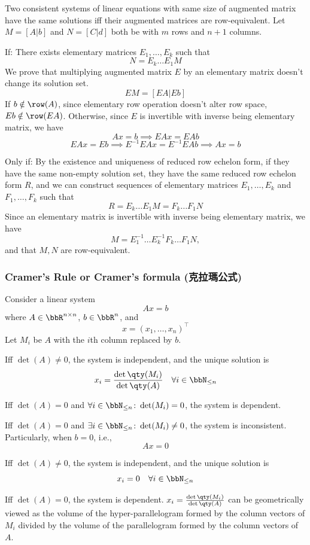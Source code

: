 \documentclass[a4paper,12pt]{report}
\begin{document}
Two consistent systems of linear equations with same size of augmented matrix have the same solutions iff their augmented matrices are row-equivalent.
\bpr
Let $M=[A|b]$ and $N=[C|d]$ both be with $m$ rows and $n+1$ columns.

If: There exists elementary matrices $E_1,\ldots, E_k$ such that
\[N=E_k\ldots E_1M\]
We prove that multiplying augmented matrix $E$ by an elementary matrix doesn't change its solution set.
\[EM=[EA|Eb]\]
If $b\notin\row(A)$, since elementary row operation doesn't alter row space, $Eb\notin\row(EA)$. Otherwise, since $E$ is invertible with inverse being elementary matrix, we have
\[Ax=b\implies EAx=EAb\]
\[EAx=Eb\implies E^{-1}EAx=E^{-1}EAb\implies Ax=b\]

Only if: By the existence and uniqueness of reduced row echelon form, if they have the same non-empty solution set, they have the same reduced row echelon form $R$, and we can construct sequences of elementary matrices $E_1,\ldots,E_k$ and $F_1,\ldots,F_k$ such that
\[R=E_k\ldots E_1M=F_k\ldots F_1N\]
Since an elementary matrix is invertible with inverse being elementary matrix, we have
\[M=E_1^{-1}\ldots E_k^{-1}F_k\ldots F_1N,\]
and that $M,N$ are row-equivalent.
\epr
\subsubsection{Cramer's Rule or Cramer's formula (克拉瑪公式)}
Consider a linear system
\[Ax=b\]
where $A\in\bbR^{n\times n}$, $b\in\bbR^n$, and
\[x=(x_1,\ldots,x_n)^\top\]
Let \(M_i\) be $A$ with the \(i\)th column replaced by \(b\).
\bit
\item Iff $\det(A)\ne 0$, the system is independent, and the unique solution is
\[x_i=\frac{\det\qty(M_i)}{\det\qty(A)}\quad\forall i\in\bbN_{\le n}\]
\item Iff $\det(A)=0$ and $\forall i\in\bbN_{\le n}\colon\det(M_i)=0$, the system is dependent.
\item Iff $\det(A)=0$ and $\exists i\in\bbN_{\le n}\colon\det(M_i)\ne0$, the system is inconsistent.
\eit
Particularly, when $b=0$, i.e.,
\[Ax=0\]
\bit
\item Iff $\det(A)\ne 0$, the system is independent, and the unique solution is
\[x_i=0\quad\forall i\in\bbN_{\le n}\]
\item Iff $\det(A)=0$, the system is dependent.
\eit
$x_i=\frac{\det\qty(M_i)}{\det\qty(A)}$ can be geometrically viewed as the volume of the hyper-parallelogram formed by the column vectors of $M_i$ divided by the volume of the parallelogram formed by the column vectors of $A$.
\end{document}
